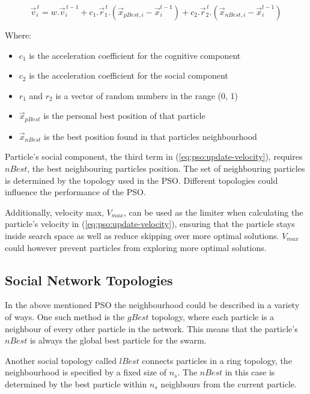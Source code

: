 \documentclass[conference]{IEEEtran}
\begin{document}
\begin{equation} \label{eq:pso:update-velocity}
\vec{v}_{i}^{\,t} = w . \vec{v}_{i}^{\,t-1} + c_1 . \vec{r}_{1}^{\,t} . (\vec{x}_{pBest, i} - \vec{x}_{i}^{t-1}) + c_2 . \vec{r}_{2}^{\,t} . (\vec{x}_{nBest, i} - \vec{x}_{i}^{t-1})
\end{equation}

\noindent Where:
\begin{itemize}
	\item $c_1$ is the acceleration coefficient for the cognitive component
	\item $c_2$ is the acceleration coefficient for the social component
	\item $r_1$ and $r_2$ is a vector of random numbers in the range (0, 1)
	\item $\vec{x}_{pBest}$ is the personal best position of that particle
	\item $\vec{x}_{nBest}$ is the best position found in that particles neighbourhood
\end{itemize}
\vspace{5mm}
\noindent Particle's social component, the third term in (\ref{eq:pso:update-velocity}), requires $ nBest $, the best neighbouring particles position. The set of neighbouring particles is determined by the topology used in the \ac{PSO}. Different topologies could influence the performance of the \ac{PSO}.

Additionally, velocity max, $ V_{max} $, can be used as the limiter when calculating the particle's velocity in (\ref{eq:pso:update-velocity}), ensuring that the particle stays inside search space as well as reduce skipping over more optimal solutions. $ V_{max} $ could however prevent particles from exploring more optimal solutions.

    \subsection{Social Network Topologies}
    
    In the above mentioned \ac{PSO} the neighbourhood could be described in a variety of ways. One such method is the $ gBest $ topology, where each particle is a neighbour of every other particle in the network. This means that the particle's $ nBest $ is always the global best particle for the swarm. 
    
    Another social topology called $ lBest $ connects particles in a ring topology, the neighbourhood is specified by a fixed size of $ n_s $. The $ nBest $ in this case is determined by the best particle within $ n_s $ neighbours from the current particle\cite{vanwyk:overfitting-psoffnn}. 
    
\end{document}
